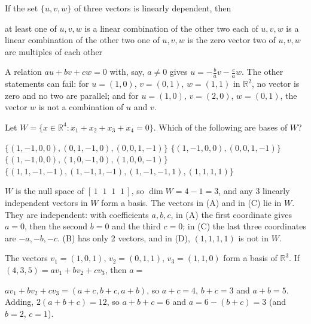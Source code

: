 \begin{question}[id=basis-14]
If the set $\{u, v, w\}$ of three vectors is linearly dependent, then
\begin{options}
  \correct at least one of $u, v, w$ is a linear combination of the other two
  \option each of $u, v, w$ is a linear combination of the other two
  \option one of $u, v, w$ is the zero vector
  \option two of $u, v, w$ are multiples of each other
\end{options}
\begin{solution}
A relation $au + bv + cw = 0$ with, say, $a \ne 0$ gives $u = -\frac{b}{a}v - \frac{c}{a}w$. The other statements can fail: for $u = (1, 0)$, $v = (0, 1)$, $w = (1, 1)$ in $\mathbb{R}^2$, no vector is zero and no two are parallel; and for $u = (1, 0)$, $v = (2, 0)$, $w = (0, 1)$, the vector $w$ is not a combination of $u$ and $v$.
\end{solution}
\end{question}

\begin{question}[id=basis-15, type=msq, marks=2]
Let $W = \{x \in \mathbb{R}^4 : x_1 + x_2 + x_3 + x_4 = 0\}$. Which of the following are bases of $W$?
\begin{options}
  \correct $\{(1, -1, 0, 0), (0, 1, -1, 0), (0, 0, 1, -1)\}$
  \option $\{(1, -1, 0, 0), (0, 0, 1, -1)\}$
  \correct $\{(1, -1, 0, 0), (1, 0, -1, 0), (1, 0, 0, -1)\}$
  \option $\{(1, 1, -1, -1), (1, -1, 1, -1), (1, -1, -1, 1), (1, 1, 1, 1)\}$
\end{options}
\begin{solution}
$W$ is the null space of $[\,1 \;\; 1 \;\; 1 \;\; 1\,]$, so $\dim W = 4 - 1 = 3$, and any 3 linearly independent vectors in $W$ form a basis. The vectors in (A) and in (C) lie in $W$. They are independent: with coefficients $a, b, c$, in (A) the first coordinate gives $a = 0$, then the second $b = 0$ and the third $c = 0$; in (C) the last three coordinates are $-a, -b, -c$. (B) has only 2 vectors, and in (D), $(1, 1, 1, 1)$ is not in $W$.
\end{solution}
\end{question}

\begin{question}[id=basis-16, marks=2]
The vectors $v_1 = (1, 0, 1)$, $v_2 = (0, 1, 1)$, $v_3 = (1, 1, 0)$ form a basis of $\mathbb{R}^3$. If $(4, 3, 5) = a v_1 + b v_2 + c v_3$, then $a =$
\begin{solution}
$a v_1 + b v_2 + c v_3 = (a + c, b + c, a + b)$, so $a + c = 4$, $b + c = 3$ and $a + b = 5$. Adding, $2(a + b + c) = 12$, so $a + b + c = 6$ and $a = 6 - (b + c) = 3$ (and $b = 2$, $c = 1$).
\end{solution}
\end{question}

